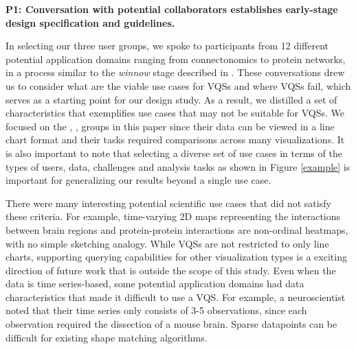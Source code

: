 {\textbf{P1: Conversation with potential collaborators establishes early-stage design specification and guidelines.} 
\par In selecting our three user groups, we spoke to participants from 12 different potential application domains ranging from connectonomics to protein networks, in a process similar to the \textit{winnow} stage described in \cite{Sedlmair2012}. These conversations drew us to consider what are the viable use cases for VQSs and where VQSs fail, which serves as a starting point for our design study. As a result, we distilled a set of characteristics that exemplifies use cases that may not be suitable for VQSs. We focused on the \astro, \bio, \matsci groups in this paper since their data can be viewed in a line chart format and their tasks required comparisons across many visualizations. It is also important to note that selecting a diverse set of use cases in terms of the types of users, data, challenges and analysis tasks as shown in Figure \ref{example} is important for generalizing our results beyond a single use case.
\par There were many interesting potential scientific use cases that did not satisfy these criteria. For example, time-varying 2D maps representing the interactions between brain regions and protein-protein interactions are non-ordinal heatmaps, with no simple sketching analogy. While VQSs are not restricted to only line charts, supporting querying capabilities for other visualization types is a exciting direction of future work that is outside the scope of this study. Even when the data is time series-based, some potential application domains had data characteristics that made it difficult to use a VQS. For example, a neuroscientist noted that their time series only consists of 3-5  observations, since each observation required the dissection of a mouse brain. Sparse datapoints can be difficult for existing shape matching algorithms.  

}

